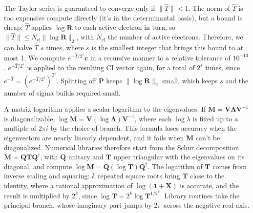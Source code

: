 \documentclass[aip,jcp,preprint]{revtex4-1}
\newcommand{\bvec}[1]{\mathbf{#1}}
\newcommand{\Nel}{N_\mathrm{el}}
\begin{document}
The Taylor series is guaranteed to converge only if $\lVert\hat{T}\rVert<1$.
The norm of $\hat{T}$ is too expensive compute directly (it's in the determinantal basis), but a bound is cheap: $\hat{T}$ applies $\log\bvec{R}$ to each active electron in turn, so $\lVert\hat{T}\rVert \le \Nel\lVert\log\bvec{R}\rVert_2$, with $\Nel$ the number of active electrons.
Therefore, we can halve $\hat{T}$ $s$ times, where $s$ is the smallest integer that brings this bound to at most 1.
We compute $e^{-\hat{T}/2^s}\bvec{c}$ in a recursive manner to a relative tolerance of $10^{-13}$.
$e^{-\hat{T}/2^s}$ is applied to the resulting CI vector again, for a total of $2^s$ times, since $e^{-\hat{T}} = (e^{-\hat{T}/2^s})^{2^s}$.
Splitting off $\bvec{P}$ keeps $\lVert\log\bvec{R}\rVert_2$ small, which keeps $s$ and the number of sigma builds required small.

A matrix logarithm applies a scalar logarithm to the eigenvalues.
If $\bvec{M} = \bvec{V}\bvec{\Lambda}\bvec{V}^{-1}$ is diagonalizable, $\log\bvec{M} = \bvec{V}(\log\bvec{\Lambda})\bvec{V}^{-1}$, where each $\log\lambda$ is fixed up to a multiple of $2\pi i$ by the choice of branch.
This formula loses accuracy when the eigenvectors are nearly linearly dependent, and it fails when $\bvec{M}$ can't be diagonalized.
Numerical libraries therefore start from the Schur decomposition $\bvec{M} = \bvec{Q}\bvec{T}\bvec{Q}^\dagger$, with $\bvec{Q}$ unitary and $\bvec{T}$ upper triangular with the eigenvalues on its diagonal, and compute $\log\bvec{M} = \bvec{Q}(\log\bvec{T})\bvec{Q}^\dagger$.\cite{Higham2008}
The logarithm of $\bvec{T}$ comes from inverse scaling and squaring: $k$ repeated square roots bring $\bvec{T}$ close to the identity, where a rational approximation of $\log(\bvec{1} + \bvec{X})$ is accurate, and the result is multiplied by $2^k$, since $\log\bvec{T} = 2^k\log\bvec{T}^{1/2^k}$.
Library routines take the principal branch, whose imaginary part jumps by $2\pi$ across the negative real axis.
\end{document}
